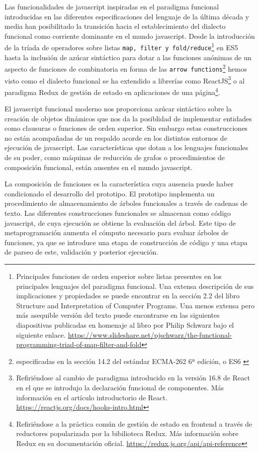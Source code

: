 Las funcionalidades de javascript inspiradas en el paradigma funcional introducidas en las diferentes especificaciones del lenguaje de la última década y media han posibilitado la transición hacia el establecimiento del dialecto funcional como corriente dominante en el mundo javascript. Desde la introducción de la tríada de operadores sobre listas \verb|map, filter y fold/reduce|\footnote{
    Principales funciones de orden superior sobre listas presentes en los principales lenguajes del paradigma funcional. Una extensa descripción de sus implicaciones y propiedades se puede encontrar en la sección 2.2 del libro Structure and Interpretation of Computer Programs\cite{sicp}. Una menos extensa pero más asequible versión del texto puede encontrarse en las siguientes diapositivas publicadas en homenaje al libro por Philip Schwarz bajo el siguiente enlace. \url{https://www.slideshare.net/pjschwarz/the-functional-programming-triad-of-map-filter-and-fold}
} en ES5\cite{es5} hasta la inclusión de azúcar sintáctico para dotar a las funciones anónimas de un aspecto de funciones de combinatoria en forma de las \verb|arrow functions|\footnote{especificadas en la sección 14.2 del estándar ECMA-262 6ª edición, o ES6 \cite{es6}} hemos visto como el dialecto funcional se ha extendido a librerías como ReactJS\footnote{Refiriéndose al cambio de paradigma introducido en la versión 16.8 de React en el que se introdujo la declaración funcional de componentes. Más información en el artículo introductorio de React. \url{https://reactjs.org/docs/hooks-intro.html}} o al paradigma Redux de gestión de estado en aplicaciones de una página\footnote{Refiriéndose a la práctica común de gestión de estado en frontend a través de reductores popularizada por la bibilioteca Redux. Más información sobre Redux en su documentación oficial. \url{https://redux.js.org/api/api-reference}}.

El javascript funcional moderno nos proporciona azúcar sintáctico sobre la creación de objetos dinámicos que nos da la posiblidad de implementar entidades como clausuras o funciones de orden superior. Sin embargo estas construcciones no están acompañadas de un respaldo acorde en los distintos entornos de ejecución de javascript. Las características que dotan a los lenguajes funcionales de su poder, como máquinas de reducción de grafos\cite{haskell-wiki-STG} o procedimientos de composición funcional\cite{haskell-wiki-FC}, están ausentes en el mundo javascript.

La composición de funciones es la característica cuya ausencia puede haber condicionado el desarrollo del prototipo. El prototipo implementa un procedimiento de almacenamiento de árboles funcionales a través de cadenas de texto. Las diferentes construcciones funcionales se almacenan como código javascript, de cuya ejecución se obtiene la evaluación del árbol. Este tipo de metaprogramación aumenta el cómputo necesario para evaluar árboles de funciones, ya que se introduce una etapa de construcción de código y una etapa de parseo de este, validación y posterior ejecución.

